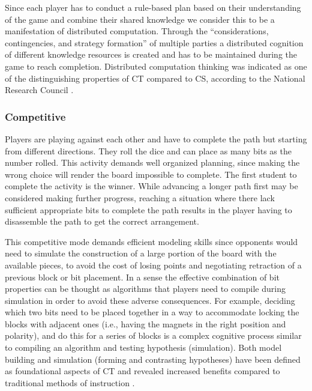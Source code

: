 \documentclass{acm_proc_article-sp}
\begin{document}
Since each player has to conduct a rule-based plan based on their understanding of the game and combine their shared knowledge we consider this to be a manifestation of distributed computation.
Through the ``considerations, contingencies, and strategy formation'' of multiple parties a distributed cognition of different knowledge resources is created\cite{weller2008escape} and has to be maintained during the game to reach completion.
Distributed computation thinking was indicated as one of the distinguishing properties of CT compared to CS, according to the National Research Council \cite{national2010report}.

\subsubsection{Competitive}
\label{sec:competition}
Players are playing against each other and have to complete the path but starting from different directions.
They roll the dice and can place as many bits as the number rolled.
This activity demands well organized planning, since making the wrong choice will render the board impossible to complete.
The first student to complete the activity is the winner.
While advancing a longer path first may be considered making further progress, reaching a situation where there lack sufficient appropriate bits to complete the path results in the player having to disassemble the path to get the correct arrangement.

This competitive mode demands efficient modeling skills since opponents would need to simulate the construction of a large portion of the board with the available pieces, to avoid the cost of losing points and negotiating retraction of a previous block or bit placement.
In a sense the effective combination of bit properties can be thought as algorithms that players need to compile during simulation in order to avoid these adverse consequences.
For example, deciding which two bits need to be placed together in a way to accommodate locking the blocks with adjacent ones (i.e., having the magnets in the right position and polarity), and do this for a series of blocks is a complex cognitive process similar to compiling an algorithm and testing hypothesis (simulation).
Both model building and simulation (forming and contrasting hypotheses) have been defined as foundational aspects of CT and revealed increased benefits compared to traditional methods of instruction \cite{wilensky2006thinking}.
\end{document}
